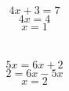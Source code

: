 \documentclass{article}
\begin{document}
\section{}
$$4x + 3 = 7
$$$$4x = 4
$$$$x = 1
$$\section{}
$$5x = 6x + 2
$$$$2 = 6x - 5 x
$$$$x = 2
$$
\end{document}
